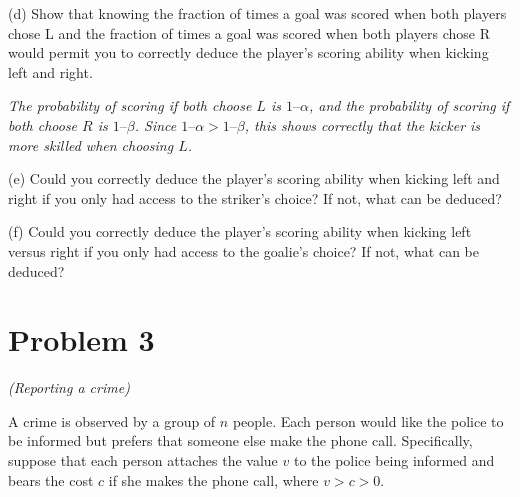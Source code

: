 \documentclass{article}
\begin{document}
(d) Show that knowing the fraction of times a goal was scored when both players chose L and the
fraction of times a goal was scored when both players chose R would permit you to correctly
deduce the player's scoring ability when kicking left and right.

\textit{The probability of scoring if both choose $L$ is $1 – \alpha$, and the probability of scoring if both choose $R$ is $1 – \beta$. Since $1 – \alpha > 1 – \beta$, this shows correctly that the kicker is more skilled when choosing $L$.}

(e) Could you correctly deduce the player's scoring ability when kicking left and right if you only
had access to the striker's choice? If not, what can be deduced?

(f) Could you correctly deduce the player's scoring ability when kicking left versus right if you only
had access to the goalie's choice? If not, what can be deduced?





\section{Problem 3} \textit{(Reporting a crime)}

A crime is observed by a group of $n$ people. Each person would like the police to be informed
but prefers that someone else make the phone call. Specifically, suppose that each person
attaches the value $v$ to the police being informed and bears the cost $c$ if she makes the
phone call, where $v > c > 0$.
\end{document}
